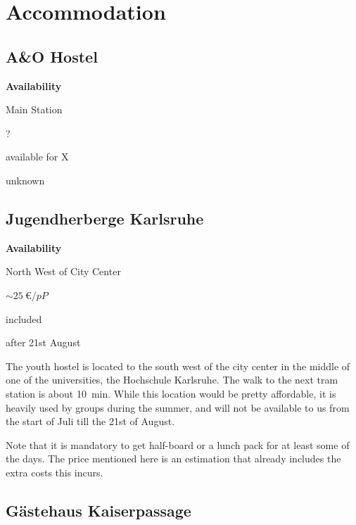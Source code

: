 

\section{Accommodation}

\subsection{A\&O Hostel}

\begin{labeling}{\bf Availability}
  \item[\bf Location] Main Station
  \item[\bf Price] ?
  \item[\bf Breakfast] available for X
  \item[\bf Availability] unknown
\end{labeling}



\subsection{Jugendherberge Karlsruhe}

\begin{labeling}{\bf Availability}
  \item[\bf Location] North West of City Center
  \item[\bf Price] $\sim\SI{25}{\euro/{pP}}$
  \item[\bf Breakfast] included
  \item[\bf Availability] after 21st August
\end{labeling}

The youth hostel is located to the south west of the city center in the middle
of one of the universities, the Hochschule Karlsruhe. The walk to the
next tram station is about \SI{10}{\minute}. While this location would be
pretty affordable, it is heavily used by groups during the summer, and will
not be available to us from the start of Juli till the 21st of August.

Note that it is mandatory to get half-board or a lunch pack for at least some
of the days. The price mentioned here is an estimation that already includes
the extra costs this incurs.

\subsection{Gästehaus Kaiserpassage}

